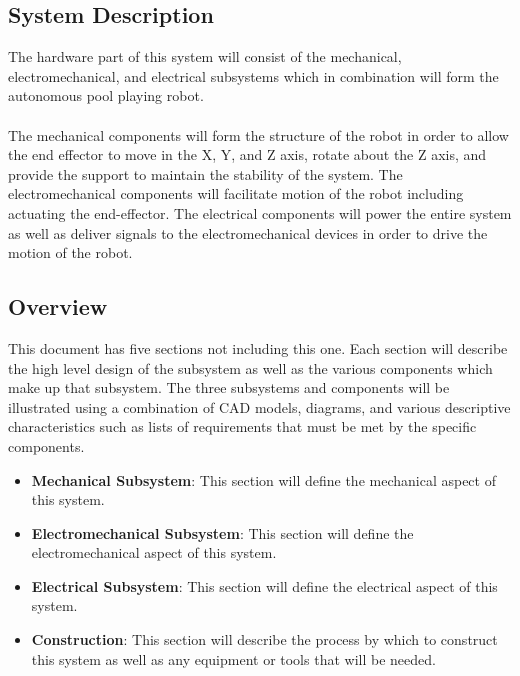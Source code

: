 \documentclass[titlepage]{article}
\begin{document}
\subsection{System Description}
The hardware part of this system will consist of the mechanical, electromechanical, and electrical subsystems which in combination will form the autonomous pool playing robot.\\\\
The mechanical components will form the structure of the robot in order to allow the end effector to move in the X, Y, and Z axis, rotate about the Z axis, and provide the support to maintain the stability of the system. The electromechanical components will facilitate motion of the robot including actuating the end-effector. The electrical components will power the entire system as well as deliver signals to the electromechanical devices in order to drive the motion of the robot.
\subsection{Overview}
This document has five sections not including this one. Each section will describe the high level design of the subsystem as well as the various components which make up that subsystem. The three subsystems and components will be illustrated using a combination of CAD models, diagrams, and various descriptive characteristics such as lists of requirements that must be met by the specific components.\\
\begin{itemize}


	\item \textbf{Mechanical Subsystem}: This section will define the mechanical aspect of this system.\\
	\item \textbf{Electromechanical Subsystem}: This section will define the electromechanical aspect of this system.\\
	\item \textbf{Electrical Subsystem}: This section will define the electrical aspect of this system.\\
	\item \textbf{Construction}: This section will describe the process by which to construct this system as well as any equipment or tools that will be needed.\\
\end{itemize}
\end{document}
